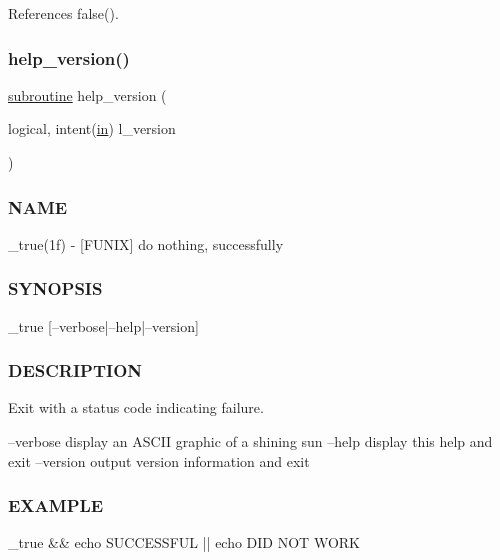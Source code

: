 References false().

\mbox{\label{__true_8f90_a39c21619b08a3c22f19e2306efd7f766}} 
\subsubsection{\texorpdfstring{help\+\_\+version()}{help\_version()}}
{\footnotesize\ttfamily \hyperlink{M__stopwatch_83_8txt_acfbcff50169d691ff02d4a123ed70482}{subroutine} help\+\_\+version (\begin{DoxyParamCaption}\item[{logical, intent(\hyperlink{M__journal_83_8txt_afce72651d1eed785a2132bee863b2f38}{in})}]{l\+\_\+version }\end{DoxyParamCaption})}



\subsubsection*{N\+A\+ME}

\+\_\+true(1f) -\/ \mbox{[}F\+U\+N\+IX\mbox{]} do nothing, successfully 

\subsubsection*{S\+Y\+N\+O\+P\+S\+IS}

\begin{DoxyVerb}    _true [--verbose|--help|--version]
\end{DoxyVerb}


\subsubsection*{D\+E\+S\+C\+R\+I\+P\+T\+I\+ON}

Exit with a status code indicating failure.

--verbose display an A\+S\+C\+II graphic of a shining sun --help display this help and exit --version output version information and exit

\subsubsection*{E\+X\+A\+M\+P\+LE}

\begin{DoxyVerb}    _true && echo SUCCESSFUL || echo DID NOT WORK
\end{DoxyVerb}
